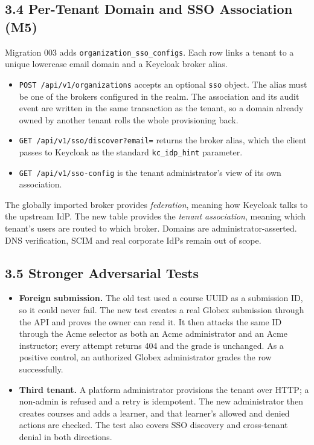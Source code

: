\documentclass{article}
\begin{document}
\subsection*{3.4 Per-Tenant Domain and SSO Association (M5)}
Migration 003 adds \texttt{organization\_sso\_configs}. Each row links a tenant to a unique lowercase email domain and a Keycloak broker alias.

\begin{itemize}
    \item \texttt{POST /api/v1/organizations} accepts an optional \texttt{sso} object. The alias must be one of the brokers configured in the realm. The association and its audit event are written in the same transaction as the tenant, so a domain already owned by another tenant rolls the whole provisioning back.
    \item \texttt{GET /api/v1/sso/discover?email=} returns the broker alias, which the client passes to Keycloak as the standard \texttt{kc\_idp\_hint} parameter.
    \item \texttt{GET /api/v1/sso-config} is the tenant administrator's view of its own association.
\end{itemize}

The globally imported broker provides \emph{federation}, meaning how Keycloak talks to the upstream IdP. The new table provides the \emph{tenant association}, meaning which tenant's users are routed to which broker. Domains are administrator-asserted. DNS verification, SCIM and real corporate IdPs remain out of scope.

\subsection*{3.5 Stronger Adversarial Tests}
\begin{itemize}
    \item \textbf{Foreign submission.} The old test used a course UUID as a submission ID, so it could never fail. The new test creates a real Globex submission through the API and proves the owner can read it. It then attacks the same ID through the Acme selector as both an Acme administrator and an Acme instructor; every attempt returns 404 and the grade is unchanged. As a positive control, an authorized Globex administrator grades the row successfully.
    \item \textbf{Third tenant.} A platform administrator provisions the tenant over HTTP; a non-admin is refused and a retry is idempotent. The new administrator then creates courses and adds a learner, and that learner's allowed and denied actions are checked. The test also covers SSO discovery and cross-tenant denial in both directions.
\end{itemize}
\end{document}
